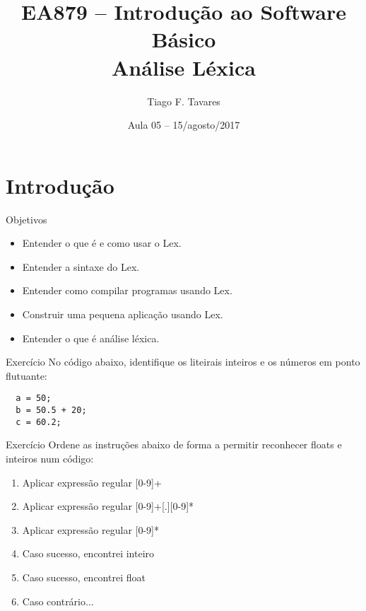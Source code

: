\documentclass{beamer}
\title[05-Análise Léxica]{EA879 -- Introdução ao Software Básico\\Análise Léxica}
\author{Tiago F. Tavares}
\institute{FEEC -- UNICAMP}
\date{Aula 05 -- 15/agosto/2017}
\begin{document}
\begin{frame}
  \titlepage
\end{frame}


\section{Introdução}

\begin{frame}{Objetivos}
  \Large
  \begin{itemize}
    \item Entender o que é e como usar o Lex.
    \item Entender a sintaxe do Lex.
    \item Entender como compilar programas usando Lex.
    \item Construir uma pequena aplicação usando Lex.
    \item Entender o que é análise léxica.
  \end{itemize}
\end{frame}

\begin{frame}[fragile]{Exercício}
  \centering
  No código abaixo, identifique os liteirais inteiros e os números em ponto
  flutuante:

  \begin{verbatim}
  a = 50;
  b = 50.5 + 20;
  c = 60.2;
  \end{verbatim}

\end{frame}

\begin{frame}{Exercício}
  Ordene as instruções abaixo de forma a permitir reconhecer floats e inteiros
  num código:
  \begin{enumerate}
    \item Aplicar expressão regular \textsc{[0-9]+}
    \item Aplicar expressão regular \textsc{[0-9]+[.][0-9]*}
    \item Aplicar expressão regular \textsc{[0-9]*}
    \item Caso sucesso, encontrei inteiro
    \item Caso sucesso, encontrei float
    \item Caso contrário...
  \end{enumerate}

\end{frame}
\end{document}
